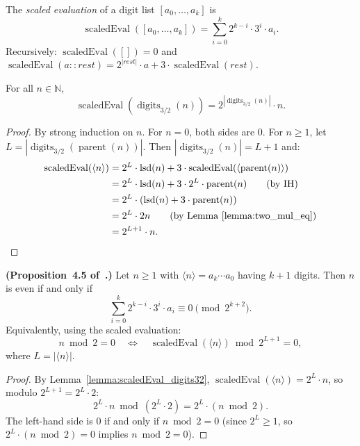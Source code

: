 \begin{definition}\label{def:scaledEval}\leanok
The \emph{scaled evaluation} of a digit list $[a_0, \ldots, a_k]$ is
\[
  \operatorname{scaledEval}([a_0, \ldots, a_k])
  = \sum_{i=0}^{k} 2^{k-i} \cdot 3^i \cdot a_i.
\]
Recursively: $\operatorname{scaledEval}([]) = 0$ and
$\operatorname{scaledEval}(a :: \mathit{rest}) = 2^{|\mathit{rest}|} \cdot a + 3 \cdot \operatorname{scaledEval}(\mathit{rest})$.
\end{definition}

\begin{lemma}\label{lemma:scaledEval_digits32}\leanok
For all $n \in \mathbb{N}$,
\[
  \operatorname{scaledEval}(\operatorname{digits}_{3/2}(n))
  = 2^{|\operatorname{digits}_{3/2}(n)|} \cdot n.
\]
\end{lemma}
\begin{proof}\leanok
By strong induction on $n$.  For $n = 0$, both sides are $0$.
For $n \ge 1$, let $L = |\operatorname{digits}_{3/2}(\operatorname{parent}(n))|$.
Then $|\operatorname{digits}_{3/2}(n)| = L + 1$ and:
\begin{align*}
  \operatorname{scaledEval}(\langle n \rangle)
  &= 2^L \cdot \operatorname{lsd}(n) + 3 \cdot \operatorname{scaledEval}(\langle \operatorname{parent}(n) \rangle) \\
  &= 2^L \cdot \operatorname{lsd}(n) + 3 \cdot 2^L \cdot \operatorname{parent}(n)
    \tag{by IH} \\
  &= 2^L \cdot (\operatorname{lsd}(n) + 3 \cdot \operatorname{parent}(n)) \\
  &= 2^L \cdot 2n
    \tag{by Lemma~\ref{lemma:two_mul_eq}} \\
  &= 2^{L+1} \cdot n. \qedhere
\end{align*}
\end{proof}

\begin{lemma}\label{lemma:parity_criterion}\leanok
\textbf{(Proposition~4.5 of~\cite{eli25}.)}
Let $n \ge 1$ with $\langle n \rangle = a_k \cdots a_0$ having $k+1$ digits.
Then $n$ is even if and only if
\[
  \sum_{i=0}^{k} 2^{k-i} \cdot 3^i \cdot a_i \equiv 0 \pmod{2^{k+2}}.
\]
Equivalently, using the scaled evaluation:
\[
  n \bmod 2 = 0 \quad \iff \quad
  \operatorname{scaledEval}(\langle n \rangle) \bmod 2^{L+1} = 0,
\]
where $L = |\langle n \rangle|$.
\end{lemma}
\begin{proof}\leanok
By Lemma~\ref{lemma:scaledEval_digits32},
$\operatorname{scaledEval}(\langle n \rangle) = 2^L \cdot n$,
so modulo $2^{L+1} = 2^L \cdot 2$:
\[
  2^L \cdot n \bmod (2^L \cdot 2) = 2^L \cdot (n \bmod 2).
\]
The left-hand side is $0$ if and only if $n \bmod 2 = 0$
(since $2^L \ge 1$, so $2^L \cdot (n \bmod 2) = 0$ implies $n \bmod 2 = 0$).
\end{proof}

